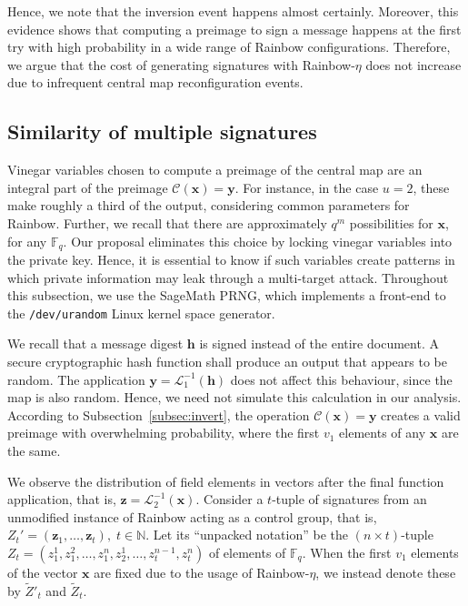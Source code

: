 \documentclass[12pt, a4paper, oneside]{memoir}
\theoremstyle{definition}
\begin{document}
Hence, we note that the inversion event happens almost certainly. Moreover, this evidence shows that computing a preimage to sign a message happens at the first try with high probability in a wide range of Rainbow configurations. Therefore, we argue that the cost of generating signatures with Rainbow-$\eta$ does not increase due to infrequent central map reconfiguration events.

\subsection{Similarity of multiple signatures}\label{subsec:similar}

Vinegar variables chosen to compute a preimage of the central map are an integral part of the
preimage $\mathcal{C}(\mathbf{x}) = \mathbf{y}$. For instance, in the case $u = 2$, these make roughly a third of the output, considering common parameters for Rainbow. Further, we recall that there are approximately $q^{m}$ possibilities for $\mathbf{x}$, for any $\mathbb{F}_{q}$. Our proposal eliminates this choice by locking vinegar variables into the private key. Hence, it is essential to know if such variables create patterns in which private information may leak through a multi-target attack. Throughout this subsection, we use the SageMath PRNG, which implements a front-end to the \texttt{/dev/urandom} Linux kernel space generator.

We recall that a message digest $\mathbf{h}$ is signed instead of the entire document. A secure cryptographic hash function shall produce an output that appears to be random. The application $\mathbf{y} = \mathcal{L}_{1}^{-1}(\mathbf{h})$ does not affect this behaviour, since the map is also random. Hence, we need not simulate this calculation in our analysis. According to Subsection~\ref{subsec:invert}, the operation $\mathcal{C}(\mathbf{x}) = \mathbf{y}$ creates a valid preimage with overwhelming probability, where the first $v_{1}$ elements of any $\mathbf{x}$ are the same.

We observe the distribution of field elements in vectors after the final function application, that is, $\mathbf{z} = \mathcal{L}_{2}^{-1}(\mathbf{x})$. Consider a $t$-tuple of signatures from an unmodified instance of Rainbow acting as a control group, that is, $Z_{t}' = (\mathbf{z}_{1}, \dots, \mathbf{z}_{t}),\; t \in \mathbb{N}$. Let its ``unpacked notation'' be the $(n \times t)$-tuple $Z_{t} = (z_{1}^{1}, z_{1}^{2}, \dots, z_{1}^{n}, z_{2}^{1}, \dots, z_{t}^{n - 1}, z_{t}^{n})$ of elements of $\mathbb{F}_{q}$. When the first $v_{1}$ elements of the vector $\mathbf{x}$ are fixed due to the usage of Rainbow-$\eta$, we instead denote these by $\widetilde{Z}'_{t}$ and $\widetilde{Z}_{t}$.
\end{document}
